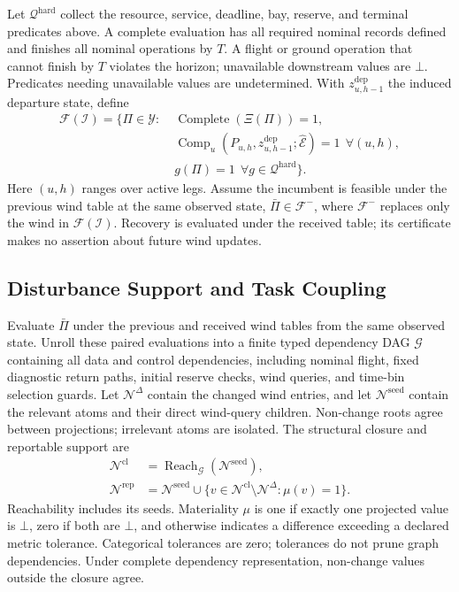 Let $\mathcal Q^{\mathrm{hard}}$ collect the resource, service, deadline,
bay, reserve, and terminal predicates above. A complete evaluation has all
required nominal records defined and finishes all nominal operations by $T$.
A flight or ground operation that cannot
finish by $T$ violates the horizon; unavailable downstream values are $\bot$.
Predicates needing unavailable values are undetermined.
With $z_{u,h-1}^{\mathrm{dep}}$ the induced departure state, define
\begin{equation}
\begin{split}
\mathcal F(\mathscr I)=\{\Pi\in\mathcal Y:\;&
\operatorname{Complete}(\Xi(\Pi))=1,\\
&\operatorname{Comp}_u(P_{u,h},z_{u,h-1}^{\mathrm{dep}};
\widehat{\mathcal E})=1\ \ \forall(u,h),\\
&g(\Pi)=1\ \ \forall g\in\mathcal Q^{\mathrm{hard}}\}.
\end{split}
\label{eq:hard_feasible_set}
\end{equation}
Here $(u,h)$ ranges over active legs. Assume the incumbent is feasible
under the previous wind table at the same observed state,
$\bar\Pi\in\mathcal F^{-}$, where $\mathcal F^{-}$ replaces only the wind
in $\mathcal F(\mathscr I)$. Recovery is evaluated under the received table;
its certificate makes no assertion about future wind updates.

\subsection{Disturbance Support and Task Coupling}
\label{subsec:propagation_diagnostic}

Evaluate $\bar\Pi$ under the previous and received wind tables from the same
observed state. Unroll these paired evaluations into a finite typed
dependency DAG $\mathcal G$ containing all data and control dependencies,
including nominal flight, fixed diagnostic return paths, initial reserve
checks, wind queries, and time-bin selection guards.
Let $\mathcal N^\Delta$ contain the changed wind entries,
and let $\mathcal N^{\mathrm{seed}}$ contain the relevant atoms and their
direct wind-query children. Non-change roots agree between
projections; irrelevant atoms are isolated. The structural closure and
reportable support are
\begin{align}
\mathcal N^{\mathrm{cl}}&=\operatorname{Reach}_{\mathcal G}
(\mathcal N^{\mathrm{seed}}),
\label{eq:structural_closure}\\
\mathcal N^{\mathrm{rep}}&=\mathcal N^{\mathrm{seed}}\cup
\{v\in\mathcal N^{\mathrm{cl}}\setminus\mathcal N^\Delta:\mu(v)=1\}.
\label{eq:reportable_support}
\end{align}
Reachability includes its seeds. Materiality $\mu$ is one if exactly one
projected value is $\bot$, zero if both are $\bot$, and otherwise indicates
a difference exceeding a declared metric tolerance. Categorical tolerances
are zero; tolerances do not prune graph dependencies. Under complete
dependency representation, non-change values outside the closure agree.

